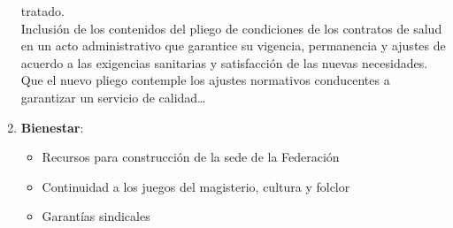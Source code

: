 \documentclass[letterpaper,11pt,twoside]{article}
\begin{document}
\begin{multicols}{2}
\begin{enumerate}
tratado.\\
Inclusión de los contenidos del pliego de condiciones de los
contratos de salud en un acto administrativo que garantice su
vigencia, permanencia y ajustes de acuerdo a las exigencias sanitarias y satisfacción de las nuevas necesidades. Que el nuevo pliego contemple los ajustes normativos conducentes a garantizar un servicio de calidad\ldots
\item \textbf{Bienestar}:
\begin{itemize}
\item Recursos para construcción de la sede de la Federación
\item Continuidad a los juegos del magisterio, cultura y folclor
\item Garantías sindicales
\end{itemize}
 \end{enumerate}
\end{multicols}
\end{document}
